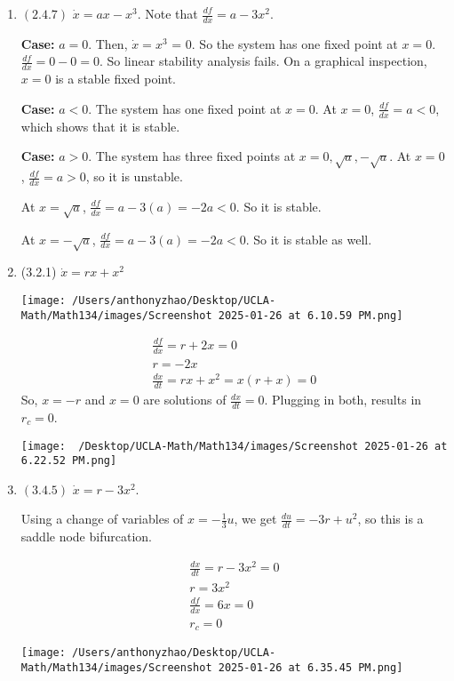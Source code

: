 \documentclass[12pt]{article}
\begin{document}

\begin{enumerate}[start=1,label={\bfseries Problem \arabic*:},leftmargin=1in] %
    \item $(2.4.7)$ $\dot{x} = ax-x^{3}$. Note that $\frac{df}{dx} = a - 3x^{2}$. 
    
    \textbf{Case:} $a=0$. Then, $\dot{x} = x^{3}$ = 0. So the system has one fixed point at $x = 0$. 
    $\frac{df}{dx} = 0-0 = 0$. So linear stability analysis fails. On a graphical inspection, $x=0$ is a stable fixed point. 

    \textbf{Case:} $a < 0$. The system has one fixed point at $x = 0$. 
    At $x = 0$, $\frac{df}{dx} = a < 0$, which shows that it is stable. 

    \textbf{Case:} $a > 0$. The system has three fixed points at $x = 0, \sqrt{a}, -\sqrt{a}$. 
    At $x = 0$, $\frac{df}{dx} = a > 0$, so it is unstable. 

    At $x = \sqrt{a}$, $\frac{df}{dx} = a - 3(a) = -2a < 0$. So it is stable. 

    At $x = -\sqrt{a}$, $\frac{df}{dx} = a - 3(a) = -2a < 0$. So it is stable as well.

    \item (3.2.1) $\dot{x} = rx + x^{2}$ 
    
    \texttt{[image: /Users/anthonyzhao/Desktop/UCLA-Math/Math134/images/Screenshot 2025-01-26 at 6.10.59 PM.png]}

    \begin{align*}
        \frac{df}{dx} = r + 2x = 0\\ 
        r= -2x \\ 
        \frac{dx}{dt} = rx + x^{2} = x(r+x) = 0
    \end{align*}
    So, $x = -r$  and $x = 0$ are solutions of $\frac{dx}{dt} = 0$. Plugging in both, results in $r_{c} = 0$. 

    \texttt{[image: ~/Desktop/UCLA-Math/Math134/images/Screenshot 2025-01-26 at 6.22.52 PM.png]}
    \item $(3.4.5)$ $\dot{x} = r - 3x^{2}$. 
    
    Using a change of variables of $x = -\frac{1}{3}u$, we get $\frac{du}{dt} = -3r + u^2$, so this is a saddle node bifurcation.
    
    \begin{align*}
        \frac{dx}{dt} = r - 3x^{2} = 0 \\ 
            r = 3x^{2}\\
        \frac{df}{dx} = 6x = 0 \\ 
        r_{c} = 0
    \end{align*}

    \texttt{[image: /Users/anthonyzhao/Desktop/UCLA-Math/Math134/images/Screenshot 2025-01-26 at 6.35.45 PM.png]}
\end{enumerate}
\end{document}
